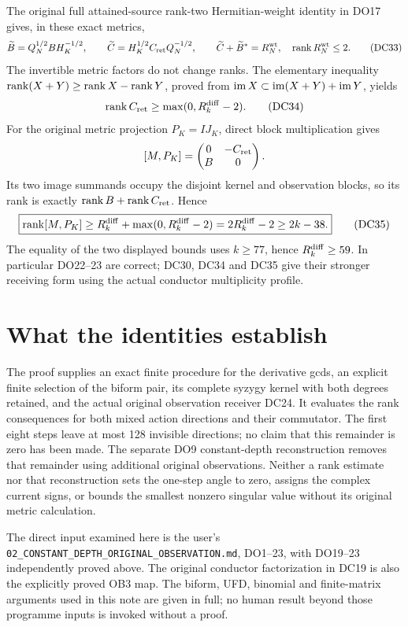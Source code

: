 \documentclass[11pt]{article}
\begin{document}
The original full attained-source rank-two Hermitian-weight identity
in DO17 gives, in these exact metrics,
\[
 \widetilde B=Q_N^{1/2}BH_K^{-1/2},\qquad
 \widetilde C=H_K^{1/2}C_{\rm ret}Q_N^{-1/2},\qquad
 \widetilde C+\widetilde B^*=R_N^{\rm wt},\quad
 \operatorname{rank} R_N^{\rm wt}\le2.                                        \tag{DC33}
\]
The invertible metric factors do not change ranks.  The elementary
inequality $\operatorname{rank}(X+Y)\ge\operatorname{rank} X-\operatorname{rank} Y$, proved from
$\operatorname{im} X\subset\operatorname{im}(X+Y)+\operatorname{im} Y$, yields
\[
 \operatorname{rank} C_{\rm ret}\ge\max(0,R_k^{\rm diff}-2).                  \tag{DC34}
\]
For the original metric projection $P_K=IJ_K$, direct block
multiplication gives
\[
 [M,P_K]=\begin{pmatrix}0&-C_{\rm ret}\\B&0\end{pmatrix}.
\]
Its two image summands occupy the disjoint kernel and observation
blocks, so its rank is exactly $\operatorname{rank} B+\operatorname{rank} C_{\rm ret}$.  Hence
\[
 \boxed{\operatorname{rank}[M,P_K]\ge
 R_k^{\rm diff}+\max(0,R_k^{\rm diff}-2)
 =2R_k^{\rm diff}-2\ge2k-38.}                                   \tag{DC35}
\]
The equality of the two displayed bounds uses $k\ge77$, hence
$R_k^{\rm diff}\ge59$.  In particular DO22--23 are correct; DC30,
DC34 and DC35 give their stronger receiving form using the actual
conductor multiplicity profile.

\section{What the identities establish}
The proof supplies an exact finite procedure for the derivative gcds,
an explicit finite selection of the biform pair, its complete syzygy
kernel with both degrees retained, and the actual original observation
receiver DC24.  It evaluates the rank consequences for both mixed
action directions and their commutator.  The first eight steps leave
at most 128 invisible directions; no claim that this remainder is
zero has been made.  The separate DO9 constant-depth reconstruction
removes that remainder using additional original observations.
Neither a rank estimate nor that reconstruction sets the one-step
angle to zero, assigns the complex current signs, or bounds the
smallest nonzero singular value without its original metric calculation.

The direct input examined here is the user's
\texttt{02\_CONSTANT\_DEPTH\_ORIGINAL\_OBSERVATION.md}, DO1--23,
with DO19--23 independently proved above.  The original conductor
factorization in DC19 is also the explicitly proved OB3 map.
The biform, UFD, binomial and finite-matrix arguments used in this
note are given in full; no human result beyond those programme
inputs is invoked without a proof.
\end{document}
